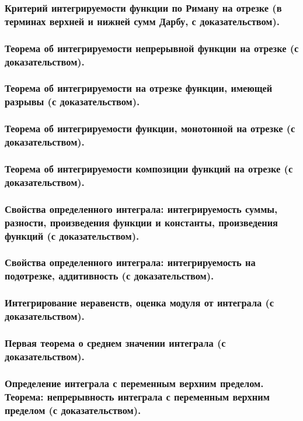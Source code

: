 \documentclass[10pt]{article}
\begin{document}
    \subsubsection{Критерий интегрируемости функции по Риману на отрезке (в терминах верхней и нижней сумм Дарбу, с доказательством).}
    \subsubsection{Теорема об интегрируемости непрерывной функции на отрезке (с доказательством).}
    \subsubsection{Теорема об интегрируемости на отрезке функции, имеющей разрывы (с доказательством).}
    \subsubsection{Теорема об интегрируемости функции, монотонной на отрезке (с доказательством).}
    \subsubsection{Теорема об интегрируемости композиции функций на отрезке (с доказательством).}
    \subsubsection{Свойства определенного интеграла: интегрируемость суммы, разности, произведения функции и константы, произведения функций (с доказательством).}
    \subsubsection{Свойства определенного интеграла: интегрируемость на подотрезке, аддитивность (с доказательством).}
    \subsubsection{Интегрирование неравенств, оценка модуля от интеграла (с доказательством).}
    \subsubsection{Первая теорема о среднем значении интеграла (с доказательством).}
    \subsubsection{Определение интеграла с переменным верхним пределом. Теорема: непрерывность интеграла с переменным верхним пределом (с доказательством).}
\end{document}
